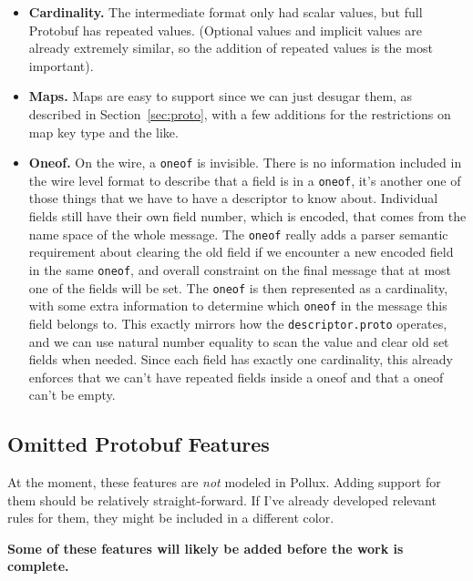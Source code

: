 \begin{itemize}
\item \textbf{Cardinality.} The intermediate format only had scalar values, but
  full Protobuf has repeated values. (Optional values and implicit values are
  already extremely similar, so the addition of repeated values is the most
  important). 
\item \textbf{Maps.} Maps are easy to support since we can just desugar them, as
  described in Section~\ref{sec:proto}, with a few additions for the
  restrictions on map key type and the like.
\item \textbf{Oneof.} On the wire, a \texttt{oneof} is invisible. There is no
  information included in the wire level format to describe that a field is in a
  \texttt{oneof}, it's another one of those things that we have to have a
  descriptor to know about. Individual fields still have their own field number,
  which is encoded, that comes from the name space of the whole message. The
  \texttt{oneof} really adds a parser semantic requirement about clearing the
  old field if we encounter a new encoded field in the same \texttt{oneof}, and
  overall constraint on the final message that at most one of the fields will be
  set. The \texttt{oneof} is then represented as a cardinality, with some extra
  information to determine which \texttt{oneof} in the message this field
  belongs to. This exactly mirrors how the \texttt{descriptor.proto} operates,
  and we can use natural number equality to scan the value and clear old set
  fields when needed. Since each field has exactly one cardinality, this already
  enforces that we can't have repeated fields inside a oneof and that a oneof
  can't be empty.
\end{itemize}

\subsection{Omitted Protobuf Features}

At the moment, these features are \emph{not} modeled in Pollux. Adding support
for them should be relatively straight-forward. If I've already developed
relevant rules for them, they might be included in a different color.

\textbf{Some of these features will likely be added before the work is complete.}

